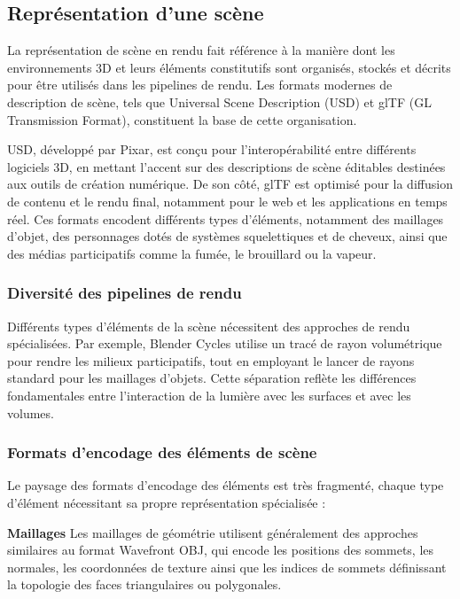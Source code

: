 \subsection{Représentation d'une scène}
La représentation de scène en rendu fait référence à la manière dont les environnements 3D et leurs éléments constitutifs sont organisés, stockés et décrits pour être utilisés dans les pipelines de rendu. Les formats modernes de description de scène, tels que Universal Scene Description (USD) et glTF (GL Transmission Format), constituent la base de cette organisation.

USD, d\'evelopp\'e par Pixar, est conçu pour l'interop\'erabilit\'e entre diff\'erents logiciels 3D, en mettant l'accent sur des descriptions de sc\`ene \'editables destin\'ees aux outils de cr\'eation num\'erique. De son c\^ot\'e, glTF est optimis\'e pour la diffusion de contenu et le rendu final, notamment pour le web et les applications en temps r\'eel. Ces formats encodent diff\'erents types d'éléments, notamment des maillages d'objet, des personnages dot\'es de syst\`emes squelettiques et de cheveux, ainsi que des m\'edias participatifs comme la fum\'ee, le brouillard ou la vapeur.

\subsubsection{Diversité des pipelines de rendu}

Différents types d'éléments de la scène nécessitent des approches de rendu spécialisées. Par exemple, Blender Cycles utilise un tracé de rayon volumétrique pour rendre les milieux participatifs, tout en employant le lancer de rayons standard pour les maillages d'objets. Cette séparation reflète les différences fondamentales entre l'interaction de la lumière avec les surfaces et avec les volumes.

\subsubsection{Formats d'encodage des éléments de scène}

Le paysage des formats d'encodage des éléments est très fragmenté, chaque type d'élément nécessitant sa propre représentation spécialisée :

\textbf{Maillages}  
Les maillages de géométrie utilisent généralement des approches similaires au format Wavefront OBJ, qui encode les positions des sommets, les normales, les coordonnées de texture ainsi que les indices de sommets définissant la topologie des faces triangulaires ou polygonales.

